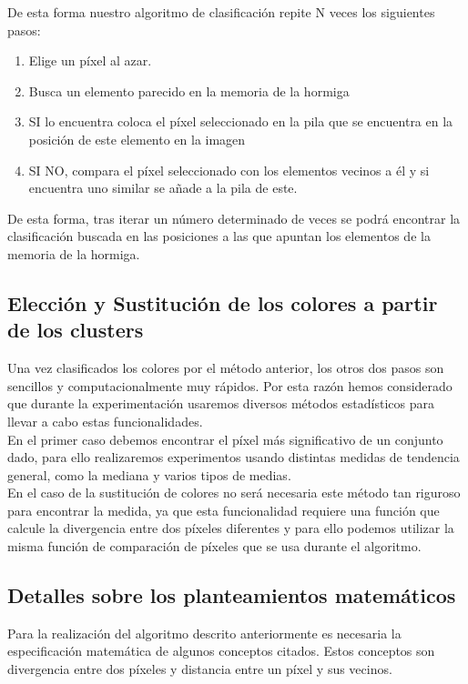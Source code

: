 \documentclass{pid}
\begin{document}
De esta forma nuestro algoritmo de clasificación repite N veces los siguientes pasos:\\
\begin{enumerate}
    \item Elige un píxel al azar.\\
    \item Busca un elemento parecido en la memoria de la hormiga\\
    \item SI lo encuentra coloca el píxel seleccionado en la pila que se encuentra en la posición de este elemento en la imagen\\
    \item SI NO, compara el píxel seleccionado con los elementos vecinos a él y si encuentra uno similar se añade a la pila de este.\\
\end{enumerate}
De esta forma, tras iterar un número determinado de veces se podrá encontrar la clasificación buscada en las posiciones a las que apuntan los elementos de la memoria de la hormiga.\\

\subsection{Elección y Sustitución de los colores a  partir de los clusters}
Una vez clasificados los colores por el método anterior, los otros dos pasos son sencillos y computacionalmente muy rápidos. Por esta razón hemos considerado que durante la experimentación usaremos diversos métodos estadísticos para llevar a cabo estas funcionalidades.\\

En el primer caso debemos encontrar el píxel más significativo de un conjunto dado, para ello realizaremos experimentos usando distintas medidas de tendencia general, como la mediana y varios tipos de medias.\\

En el caso de la sustitución de colores no será necesaria este método tan riguroso para encontrar la medida, ya que esta funcionalidad requiere una función que calcule la divergencia entre dos píxeles diferentes y para ello podemos utilizar la misma función de comparación de píxeles que se usa durante el algoritmo.\\

\subsection{Detalles sobre los planteamientos matemáticos}
Para la realización del algoritmo descrito anteriormente es necesaria la especificación matemática de algunos conceptos citados. Estos conceptos son divergencia entre dos píxeles y distancia entre un píxel y sus vecinos.\\
\end{document}
